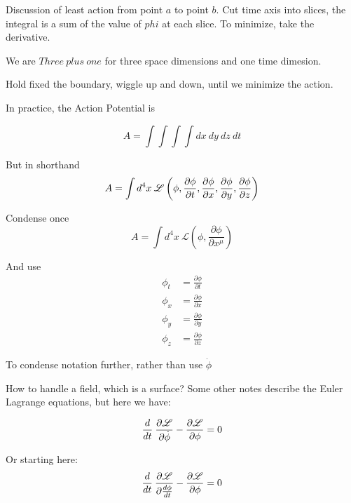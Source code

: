 \documentclass{article}
\begin{document}
Discussion of least action from point $a$ to point $b$.  Cut time axis into
slices, the integral is a sum of the value of $phi$ at each slice.  To minimize,
take the derivative.


We are $Three\: plus\: one$ for three space dimensions and one time dimesion.

Hold fixed the boundary, wiggle up and down, until we minimize the action.

In practice, the Action Potential is

\begin{equation}
A  = \int \int \int \int dx\: dy\: dz\: dt
\end{equation}

But in shorthand
\begin{equation}
A  = \int d^4 x \: \mathscr{L} \left(\phi, \frac{\partial \phi}{\partial t},\\
\frac{\partial \phi}{\partial x}, \frac{\partial \phi}{\partial y},\\
\frac{\partial \phi}{\partial z}\right)
\end{equation}

Condense once
\begin{equation}
A  = \int d^4 x \: \mathscr{L} \left(\phi, \frac{\partial \phi}{\partial x^\mu} \right)
\end{equation}

And use
\begin{equation}
\begin{split}
\phi_t &= \frac{\partial \phi}{\partial t}\\
\phi_x &= \frac{\partial \phi}{\partial x}\\
\phi_y &= \frac{\partial \phi}{\partial y}\\
\phi_z &= \frac{\partial \phi}{\partial z}
\end{split}
\end{equation}

To condense notation further, rather than use $\dot \phi$

How to handle a field, which is a surface?   Some other notes describe the
Euler Lagrange equations, but here we have:

\begin{equation}
\frac{d}{dt} \: \frac{\partial \mathscr{L}}{\partial \dot \phi} -\\
\frac{\partial \mathscr{L}}{\partial \phi} = 0
\end{equation}

Or starting here:
\begin{equation}
\frac{d}{dt} \: \frac{\partial \mathscr{L}}{\partial \frac{d \phi}{dt}} -\\
\frac{\partial \mathscr{L}}{\partial \phi} = 0
\end{equation}
\end{document}
